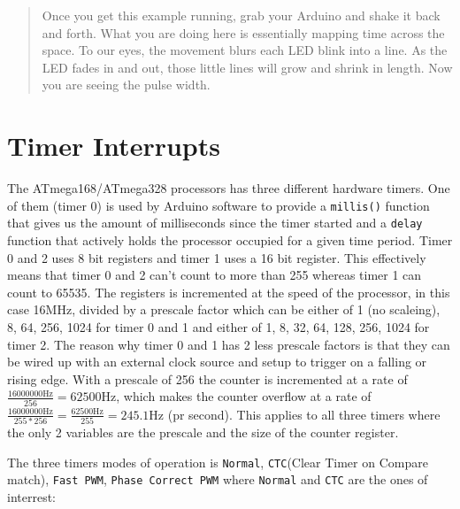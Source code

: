 \documentclass[a4paper, oneside, draft]{memoir}
\begin{document}
\begin{quotation}

  Once you get this example running, grab your Arduino and shake it
  back and forth. What you are doing here is essentially mapping time
  across the space. To our eyes, the movement blurs each LED blink
  into a line. As the LED fades in and out, those little lines will
  grow and shrink in length. Now you are seeing the pulse width.
\end{quotation}



\section{Timer Interrupts}


The ATmega168/ATmega328 processors has three different hardware
timers. One of them (timer 0) is used by Arduino software to provide a
\texttt{millis()} function that gives us the amount of milliseconds
since the timer started and a \texttt{delay} function that actively
holds the processor occupied for a given time period. Timer 0 and 2
uses 8 bit registers and timer 1 uses a 16 bit register. This
effectively means that timer 0 and 2 can't count to more than 255
whereas timer 1 can count to 65535. The registers is incremented at
the speed of the processor, in this case 16MHz, divided by a prescale
factor which can be either of 1 (no scaleing), 8, 64, 256, 1024 for
timer 0 and 1 and either of 1, 8, 32, 64, 128, 256, 1024 for timer
2. The reason why timer 0 and 1 has 2 less prescale factors is that
they can be wired up with an external clock source and setup to
trigger on a falling or rising edge. With a prescale of 256 the
counter is incremented at a rate of $\frac{16000000\mathrm{Hz}}{256} =
62500\mathrm{Hz}$, which makes the counter overflow at a rate of
$\frac{16000000\mathrm{Hz}}{255*256} = \frac{62500\mathrm{Hz}}{255} =
245.1\mathrm{Hz}$ (pr second). This applies to all three timers where the only
2 variables are the prescale and the size of the counter register.

The three timers modes of operation is \texttt{Normal},
\texttt{CTC}(Clear Timer on Compare match), \texttt{Fast PWM},
\texttt{Phase Correct PWM} where \texttt{Normal} and \texttt{CTC} are
the ones of interrest:
\end{document}
